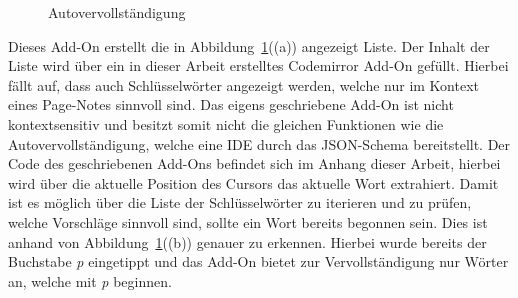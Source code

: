 \begin{figure}[h]
    \centering
    \qquad
    \caption{Autovervollständigung}
    \label{fig:autocompletion}
\end{figure}

Dieses Add-On erstellt die in Abbildung~\ref{fig:autocompletion}((a)) angezeigt Liste.
Der Inhalt der Liste wird über ein in dieser Arbeit erstelltes Codemirror Add-On gefüllt.
Hierbei fällt auf, dass auch Schlüsselwörter angezeigt werden, welche nur im Kontext eines Page-Notes sinnvoll sind.
Das eigens geschriebene Add-On ist nicht kontextsensitiv und besitzt somit nicht die gleichen Funktionen wie die Autovervollständigung, welche eine \ac{IDE} durch das JSON-Schema bereitstellt.
Der Code des geschriebenen Add-Ons befindet sich im Anhang dieser Arbeit, hierbei wird über die aktuelle Position des Cursors das aktuelle Wort extrahiert.
Damit ist es möglich über die Liste der Schlüsselwörter zu iterieren und zu prüfen, welche Vorschläge sinnvoll sind, sollte ein Wort bereits begonnen sein.
Dies ist anhand von Abbildung~\ref{fig:autocompletion}((b)) genauer zu erkennen.
Hierbei wurde bereits der Buchstabe \textit{p} eingetippt und das Add-On bietet zur Vervollständigung nur Wörter an, welche mit \textit{p} beginnen.

